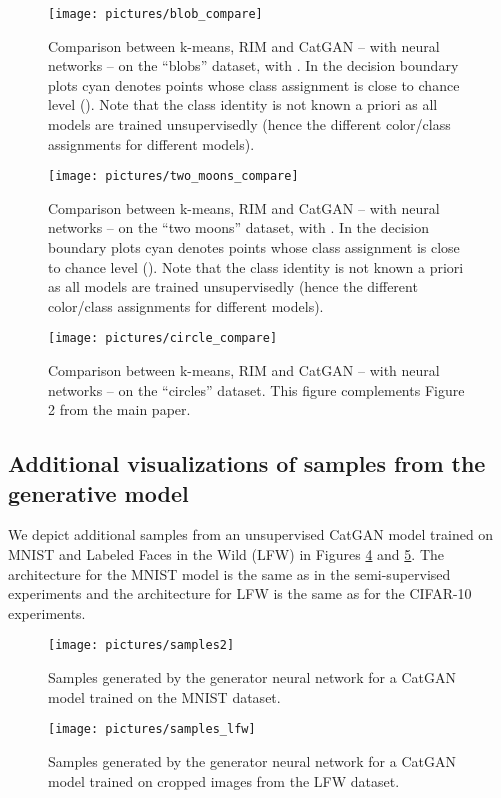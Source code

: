 \documentclass{article} \usepackage{iclr2016_conference,times}
\begin{document}
\begin{appendix}
\begin{figure}[h]
  \texttt{[image: pictures/blob\_compare]}
  \caption{Comparison between k-means, RIM and CatGAN -- with neural
    networks -- on the ``blobs'' dataset, with . In the decision boundary
    plots cyan denotes points whose class assignment is close to
    chance level (). Note that the
    class identity is not known a priori as all models are trained
    unsupervisedly (hence the different color/class assignments for
    different models).}
  \label{fig:blobs_compare}
\end{figure}

\begin{figure}[h]
  \texttt{[image: pictures/two\_moons\_compare]}
  \caption{Comparison between k-means, RIM and CatGAN -- with neural
    networks -- on the ``two moons'' dataset, with . In the decision boundary
    plots cyan denotes points whose class assignment is close to
    chance level (). Note that the
    class identity is not known a priori as all models are trained
    unsupervisedly (hence the different color/class assignments for
    different models).}
  \label{fig:moons_compare}
\end{figure}



\begin{figure}[h]
  \texttt{[image: pictures/circle\_compare]}
  \caption{Comparison between k-means, RIM and CatGAN -- with neural
    networks -- on the ``circles'' dataset. This figure complements
    Figure 2 from the main paper.}
  \label{fig:circles_compare}
\end{figure}

\subsection{Additional visualizations of samples from the generative model}
We depict additional samples from an unsupervised CatGAN model trained
on MNIST and Labeled Faces in the Wild (LFW)\citep{LFWTech} in Figures
\ref{fig:mnist_samples_big} and \ref{fig:lfw_samples_big}. The
architecture for the MNIST model is the same as in the semi-supervised
experiments and the architecture for LFW is the same as for the
CIFAR-10 experiments.

\begin{figure}[h]
  \centering
  \texttt{[image: pictures/samples2]}
  \caption{Samples generated by the generator neural network  for a
    CatGAN model trained on the MNIST dataset.}
  \label{fig:mnist_samples_big}
\end{figure}


\begin{figure}[h]
  \texttt{[image: pictures/samples\_lfw]}
  \caption{Samples generated by the generator neural network  for a
    CatGAN model trained on cropped images from the LFW dataset.}
  \label{fig:lfw_samples_big}
\end{figure}

\end{appendix}
\end{document}
